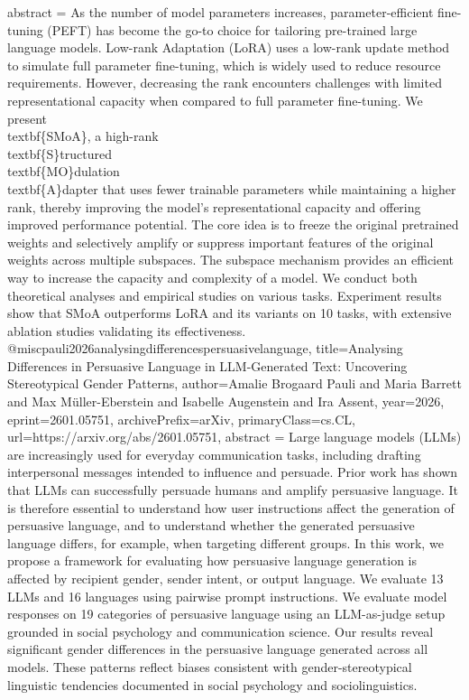 {      abstract = {As the number of model parameters increases, parameter-efficient fine-tuning (PEFT) has become the go-to choice for tailoring pre-trained large language models. Low-rank Adaptation (LoRA) uses a low-rank update method to simulate full parameter fine-tuning, which is widely used to reduce resource requirements. However, decreasing the rank encounters challenges with limited representational capacity when compared to full parameter fine-tuning. We present \\textbf\{SMoA\}, a high-rank \\textbf\{S\}tructured \\textbf\{MO\}dulation \\textbf\{A\}dapter that uses fewer trainable parameters while maintaining a higher rank, thereby improving the model's representational capacity and offering improved performance potential. The core idea is to freeze the original pretrained weights and selectively amplify or suppress important features of the original weights across multiple subspaces. The subspace mechanism provides an efficient way to increase the capacity and complexity of a model. We conduct both theoretical analyses and empirical studies on various tasks. Experiment results show that SMoA outperforms LoRA and its variants on 10 tasks, with extensive ablation studies validating its effectiveness.}
}@misc{pauli2026analysingdifferencespersuasivelanguage,
      title={Analysing Differences in Persuasive Language in LLM-Generated Text: Uncovering Stereotypical Gender Patterns}, 
      author={Amalie Brogaard Pauli and Maria Barrett and Max Müller-Eberstein and Isabelle Augenstein and Ira Assent},
      year={2026},
      eprint={2601.05751},
      archivePrefix={arXiv},
      primaryClass={cs.CL},
      url={https://arxiv.org/abs/2601.05751},
      abstract = {Large language models (LLMs) are increasingly used for everyday communication tasks, including drafting interpersonal messages intended to influence and persuade. Prior work has shown that LLMs can successfully persuade humans and amplify persuasive language. It is therefore essential to understand how user instructions affect the generation of persuasive language, and to understand whether the generated persuasive language differs, for example, when targeting different groups. In this work, we propose a framework for evaluating how persuasive language generation is affected by recipient gender, sender intent, or output language. We evaluate 13 LLMs and 16 languages using pairwise prompt instructions. We evaluate model responses on 19 categories of persuasive language using an LLM-as-judge setup grounded in social psychology and communication science. Our results reveal significant gender differences in the persuasive language generated across all models. These patterns reflect biases consistent with gender-stereotypical linguistic tendencies documented in social psychology and sociolinguistics.}
}
